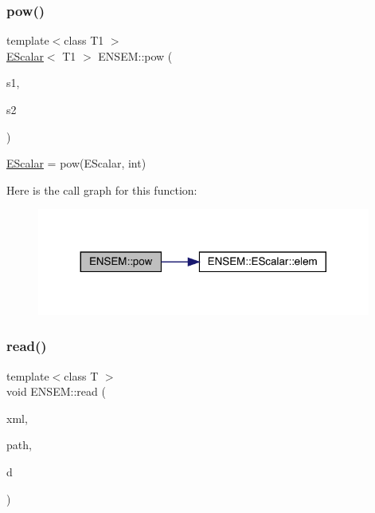 \subsubsection{\texorpdfstring{pow()}{pow()}\hspace{0.1cm}{\footnotesize\ttfamily [2/2]}}
{\footnotesize\ttfamily template$<$class T1 $>$ \\
\mbox{\hyperlink{classENSEM_1_1EScalar}{E\+Scalar}}$<$ T1 $>$ E\+N\+S\+E\+M\+::pow (\begin{DoxyParamCaption}\item[{const \mbox{\hyperlink{classENSEM_1_1EScalar}{E\+Scalar}}$<$ T1 $>$ \&}]{s1,  }\item[{int}]{s2 }\end{DoxyParamCaption})\hspace{0.3cm}{\ttfamily [inline]}}



\mbox{\hyperlink{classENSEM_1_1EScalar}{E\+Scalar}} = pow(\+E\+Scalar, int) 

Here is the call graph for this function\+:
\nopagebreak
\begin{figure}[H]
\begin{center}
\leavevmode
\includegraphics[width=311pt]{d4/dca/group__escalar_gaba7571beee718548316367ab8d623e70_cgraph}
\end{center}
\end{figure}
\mbox{\label{group__escalar_ga5631206e233cf75b5fb2ff13ee8b77ac}} 
\subsubsection{\texorpdfstring{read()}{read()}}
{\footnotesize\ttfamily template$<$class T $>$ \\
void E\+N\+S\+E\+M\+::read (\begin{DoxyParamCaption}\item[{\mbox{\hyperlink{classADATXML_1_1XMLReader}{A\+D\+A\+T\+X\+M\+L\+::\+X\+M\+L\+Reader}} \&}]{xml,  }\item[{const std\+::string \&}]{path,  }\item[{\mbox{\hyperlink{classENSEM_1_1EScalar}{E\+Scalar}}$<$ T $>$ \&}]{d }\end{DoxyParamCaption})\hspace{0.3cm}{\ttfamily [inline]}}



